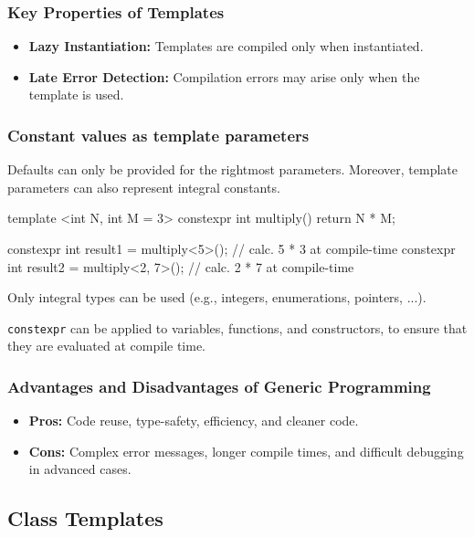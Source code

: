 \subsubsection{Key Properties of Templates}
\begin{itemize}
    \item \textbf{Lazy Instantiation:} Templates are compiled only when instantiated.
    \item \textbf{Late Error Detection:} Compilation errors may arise only when the template is used.
\end{itemize}

\subsubsection{Constant values as template parameters}
Defaults can only be provided for the rightmost parameters. Moreover, template parameters can also represent integral constants.

\begin{codeblock}[language=C++]
template <int N, int M = 3>
constexpr int multiply() {
    return N * M;
}

constexpr int result1 = multiply<5>();    // calc. 5 * 3 at compile-time
constexpr int result2 = multiply<2, 7>(); // calc. 2 * 7 at compile-time
\end{codeblock}

Only integral types can be used (e.g., integers, enumerations, pointers, ...).

\texttt{constexpr} can be applied to variables, functions, and constructors, to ensure that they are evaluated at compile time.

\subsubsection{Advantages and Disadvantages of Generic Programming}
\begin{itemize}
    \item \textbf{Pros:} Code reuse, type-safety, efficiency, and cleaner code.
    \item \textbf{Cons:} Complex error messages, longer compile times, and difficult debugging in advanced cases.
\end{itemize}

\subsection{Class Templates}

